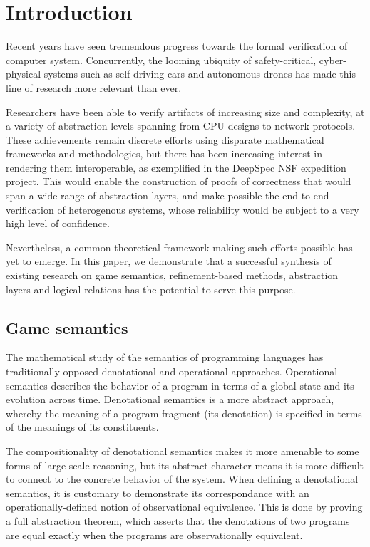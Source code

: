 \section{Introduction}

Recent years have seen tremendous progress
towards the formal verification of computer system.
Concurrently,
the looming ubiquity of safety-critical,
cyber-physical systems
such as self-driving cars and autonomous drones
has made this line of research more relevant than ever.

Researchers have been able to verify artifacts of
increasing size and complexity,
at a variety of abstraction levels spanning
from CPU designs to network protocols.
These achievements remain discrete efforts
using disparate mathematical frameworks and methodologies, but
there has been increasing interest in rendering them interoperable,
as exemplified in the DeepSpec NSF expedition project.
This would enable the construction of proofs of correctness
that would span a wide range of abstraction layers,
and make possible the end-to-end verification of heterogenous systems,
whose reliability would be subject to a very high level of confidence.

Nevertheless,
a common theoretical framework
making such efforts possible has yet to emerge.
In this paper,
we demonstrate that a successful synthesis of existing research on
game semantics,
refinement-based methods,
abstraction layers and
logical relations
has the potential to serve this purpose.

\subsection{Game semantics} %

The mathematical study of the semantics of programming languages
has traditionally opposed denotational and operational approaches.
Operational semantics describes
the behavior of a program in terms of
a global state and its evolution across time.
Denotational semantics is a more abstract approach,
whereby the meaning of a program fragment (its denotation)
is specified in terms of the meanings of its constituents.

The compositionality of denotational semantics
makes it more amenable to some forms of large-scale reasoning,
but its abstract character means it is more difficult
to connect to the concrete behavior of the system.
When defining a denotational semantics,
it is customary to demonstrate its correspondance
with an operationally-defined notion of observational equivalence.
This is done by proving a full abstraction theorem,
which asserts that the denotations of two programs 
are equal exactly when the programs are observationally equivalent.

